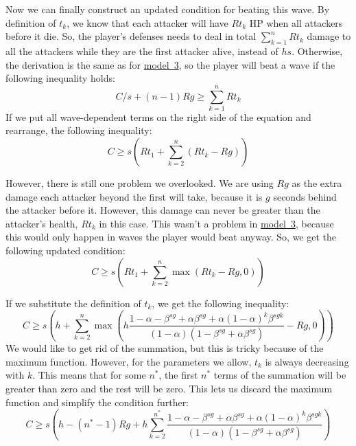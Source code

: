 Now we can finally construct an updated condition for beating this wave.
By definition of $t_k$, we know that each attacker will have $Rt_k$ HP when all attackers before it die.
So, the player's defenses needs to deal in total $\sum_{k=1}^{n} Rt_k$ damage to all the attackers while they are the first attacker alive, instead of $hs$.
Otherwise, the derivation is the same as for \hyperref[sec:analysis-waves-finite]{model~3}, so the player will beat a wave if the following inequality holds:
\begin{equation}
    C/s + (n-1)Rg \geq \sum_{k=1}^{n} Rt_k
\end{equation}
If we put all wave-dependent terms on the right side of the equation and rearrange, the following inequality:
\begin{equation}
    C \geq s\left(Rt_1 + \sum_{k=2}^{n} (Rt_k - Rg)\right)
\end{equation}

However, there is still one problem we overlooked.
We are using $Rg$ as the extra damage each attacker beyond the first will take, because it is $g$ seconds behind the attacker before it.
However, this damage can never be greater than the attacker's health, $Rt_k$ in this case.
This wasn't a problem in \hyperref[sec:analysis-waves-finite]{model~3}, because this would only happen in waves the player would beat anyway.
So, we get the following updated condition:
\begin{equation}
    C \geq s\left(Rt_1 + \sum_{k=2}^{n} \max(Rt_k - Rg, 0)\right)
\end{equation}

If we substitute the definition of $t_k$, we get the following inequality:
\begin{equation}
    C \geq s\left(h + \sum_{k=2}^{n} \max \left(
        h\frac{
                1-\alpha-\beta^{sg}+\alpha\beta^{sg}+\alpha(1-\alpha)^k\beta^{sgk}
            }{
                (1-\alpha)(1-\beta^{sg}+\alpha\beta^{sg})
            }
        - Rg, 0
        \right)\right)
\end{equation}
We would like to get rid of the summation, but this is tricky because of the maximum function.
However, for the parameters we allow, $t_k$ is always decreasing with $k$.
This means that for some $n^*$, the first $n^*$ terms of the summation will be greater than zero and the rest will be zero.
This lets us discard the maximum function and simplify the condition further:
\begin{equation}
    C \geq s\left(h - (n^*-1)Rg + h\sum_{k=2}^{n^*} \frac{
        1-\alpha-\beta^{sg}+\alpha\beta^{sg}+\alpha(1-\alpha)^k\beta^{sgk}
    }{
        (1-\alpha)(1-\beta^{sg}+\alpha\beta^{sg})
    }
    \right)
\end{equation}

